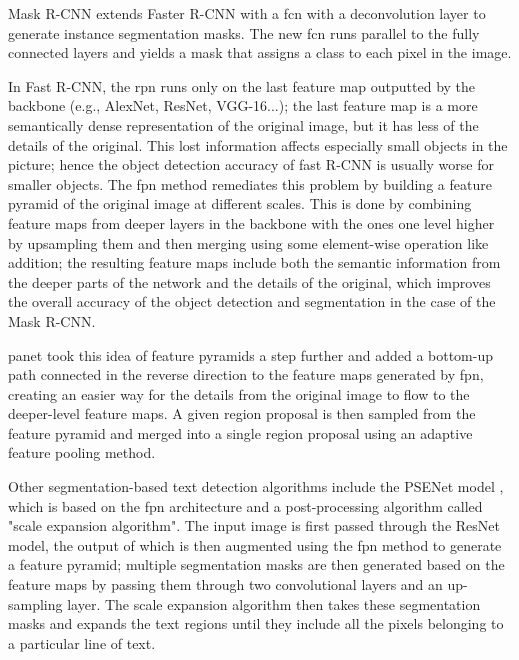 Mask R-CNN \cite{he_mask_2017} extends Faster R-CNN with a \gls{fcn} with a deconvolution layer to generate instance segmentation masks. The new \gls{fcn} runs parallel to the fully connected layers and yields a mask that assigns a class to each pixel in the image.

In Fast R-CNN, the \gls{rpn} runs only on the last feature map outputted by the backbone (e.g., AlexNet, ResNet, VGG-16...); the last feature map is a more semantically dense representation of the original image, but it has less of the details of the original. This lost information affects especially small objects in the picture; hence the object detection accuracy of fast R-CNN is usually worse for smaller objects. The \gls{fpn} method \cite{lin_feature_2017} remediates this problem by building a feature pyramid of the original image at different scales. This is done by combining feature maps from deeper layers in the backbone with the ones one level higher by upsampling them and then merging using some element-wise operation like addition; the resulting feature maps include both the semantic information from the deeper parts of the network and the details of the original, which improves the overall accuracy of the object detection and segmentation in the case of the Mask R-CNN.

\gls{panet} \cite{liu_path_2018} took this idea of feature pyramids a step further and added a bottom-up path connected in the reverse direction to the feature maps generated by \gls{fpn}, creating an easier way for the details from the original image to flow to the deeper-level feature maps. A given region proposal is then sampled from the feature pyramid and merged into a single region proposal using an adaptive feature pooling method.

Other segmentation-based text detection algorithms include the PSENet model \cite{wang_shape_2019}, which is based on the \gls{fpn} architecture and a post-processing algorithm called "scale expansion algorithm". The input image is first passed through the ResNet model, the output of which is then augmented using the \gls{fpn} method to generate a feature pyramid; multiple segmentation masks are then generated based on the feature maps by passing them through two convolutional layers and an up-sampling layer. The scale expansion algorithm then takes these segmentation masks and expands the text regions until they include all the pixels belonging to a particular line of text.


